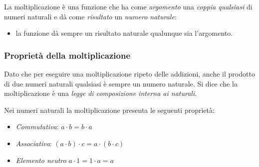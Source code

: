 La moltiplicazione è una funzione che ha come \emph{argomento} una 
\emph{coppia 
qualsiasi} di numeri naturali e dà come \emph{risultato} un \emph{numero 
naturale}:

\vspace{2em}
\begin{minipage}[t]{.48\textwidth}
\begin{center}
\begin{inaccessibleblock}
\end{inaccessibleblock}
\end{center}
\end{minipage}
\hfill
\begin{minipage}[t]{.48\textwidth}
\begin{center}
\begin{inaccessibleblock}
\end{inaccessibleblock}
\end{center}
\end{minipage}

\vspace{-1em}
\begin{osservazione}
\begin{itemize} [nosep]
\item la funzione dà sempre un risultato naturale qualunque sia l'argomento.
\end{itemize}

\end{osservazione}

\subsubsection{Proprietà della moltiplicazione}

Dato che per eseguire una moltiplicazione ripeto delle addizioni, 
anche il prodotto di due numeri  naturali qualsiasi è sempre un numero 
naturale. 
Si dice che la moltiplicazione è una \emph{legge di composizione interna ai
naturali}. 

Nei numeri naturali la moltiplicazione presenta le seguenti proprietà:

\begin{itemize} [noitemsep]
 \item \emph{Commutativa}: \(a \cdot b = b \cdot a\)
 \item \emph{Associativa}: \((a \cdot b) \cdot c = a \cdot (b \cdot c)\)
 \item \emph{Elemento neutro} \(a \cdot 1 = 1 \cdot a = a\)
\end{itemize}


